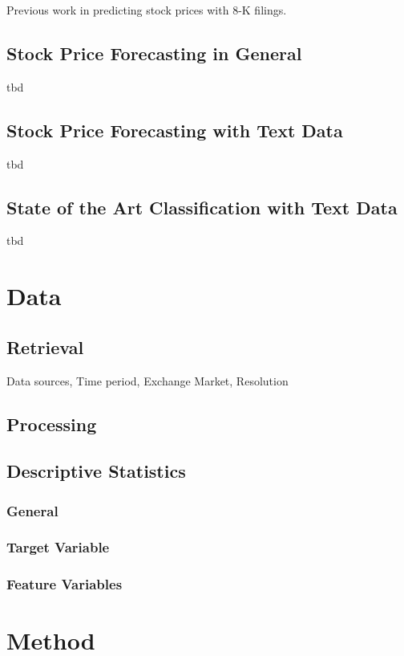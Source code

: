 \documentclass{article}
\begin{document}
	Previous work in predicting stock prices with 8-K filings.
	
	\subsection{Stock Price Forecasting in General}
	tbd 
	
	\subsection{Stock Price Forecasting with Text Data}
	tbd
	
	\subsection{State of the Art Classification with Text Data}
	tbd

	\section{Data}
	
	\subsection{Retrieval}
	
	Data sources, Time period, Exchange Market, Resolution
	
	\subsection{Processing}
	
	\subsection{Descriptive Statistics}
	
	\subsubsection{General}
	
	\subsubsection{Target Variable}
	
	\subsubsection{Feature Variables}
	

	\section{Method}
	
\end{document}
